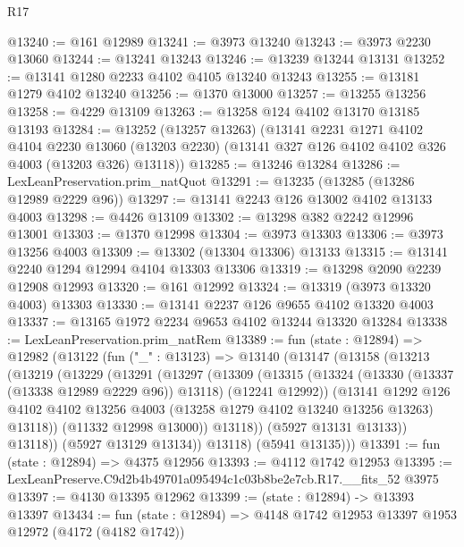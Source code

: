 \begin{lexlean}{R17}
\begin{coremodule}
@13240 := @161 @12989
@13241 := @3973 @13240
@13243 := @3973 @2230 @13060
@13244 := @13241 @13243
@13246 := @13239 @13244 @13131
@13252 := @13141 @1280 @2233 @4102 @4105 @13240 @13243
@13255 := @13181 @1279 @4102 @13240
@13256 := @1370 @13000
@13257 := @13255 @13256
@13258 := @4229 @13109
@13263 := @13258 @124 @4102 @13170 @13185 @13193
@13284 := @13252
    (@13257 @13263)
    (@13141
      @2231
      @1271
      @4102
      @4104
      @2230
      @13060
      (@13203 @2230)
      (@13141 @327 @126 @4102 @4102 @326 @4003 (@13203 @326) @13118))
@13285 := @13246 @13284
@13286 := LexLeanPreservation.prim_natQuot
@13291 := @13235 (@13285 (@13286 @12989 @2229 @96))
@13297 := @13141 @2243 @126 @13002 @4102 @13133 @4003
@13298 := @4426 @13109
@13302 := @13298 @382 @2242 @12996 @13001
@13303 := @1370 @12998
@13304 := @3973 @13303
@13306 := @3973 @13256 @4003
@13309 := @13302 (@13304 @13306) @13133
@13315 := @13141 @2240 @1294 @12994 @4104 @13303 @13306
@13319 := @13298 @2090 @2239 @12908 @12993
@13320 := @161 @12992
@13324 := @13319 (@3973 @13320 @4003) @13303
@13330 := @13141 @2237 @126 @9655 @4102 @13320 @4003
@13337 := @13165 @1972 @2234 @9653 @4102 @13244 @13320 @13284
@13338 := LexLeanPreservation.prim_natRem
@13389 := fun (state : @12894) =>
  @12982
    (@13122
      (fun ("_" : @13123) =>
      @13140
        (@13147
          (@13158
            (@13213
              (@13219
                (@13229
                  (@13291
                    (@13297
                      (@13309
                        (@13315
                          (@13324
                            (@13330 (@13337 (@13338 @12989 @2229 @96)) @13118)
                            (@12241 @12992))
                          (@13141
                            @1292
                            @126
                            @4102
                            @4102
                            @13256
                            @4003
                            (@13258 @1279 @4102 @13240 @13256 @13263)
                            @13118))
                        (@11332 @12998 @13000))
                      @13118))
                  (@5927 @13131 @13133))
                @13118))
            (@5927 @13129 @13134))
          @13118)
        (@5941 @13135)))
@13391 := fun (state : @12894) => @4375 @12956
@13393 := @4112 @1742 @12953
@13395 := LexLeanPreserve.C9d2b4b49701a095494c1c03b8be2e7cb.R17.__fits_52 @3975
@13397 := @4130 @13395 @12962
@13399 := (state : @12894) -> @13393 @13397
@13434 := fun (state : @12894) =>
  @4148
    @1742
    @12953
    @13397
    @1953
    @12972
    (@4172 (@4182 @1742))

\end{coremodule}
\end{lexlean}
